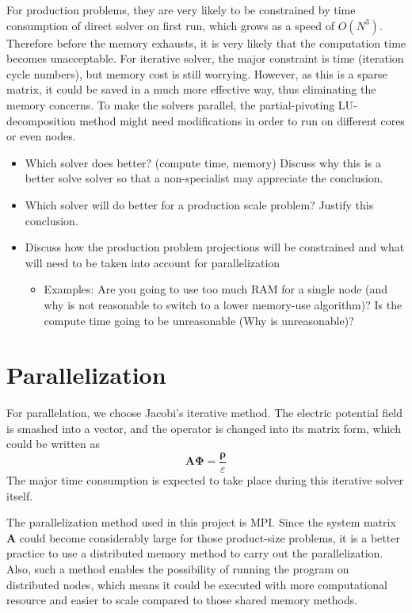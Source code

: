 \documentclass{article}
\begin{document}
\begin{spacing}{1.1}
For production problems, they are very likely to be constrained by time consumption of direct solver on first run, which grows as a speed of $O(N^3)$. Therefore before the memory exhausts, it is very likely that the computation time becomes unacceptable. For iterative solver, the major constraint is time (iteration cycle numbers), but memory cost is still worrying. However, as this is a sparse matrix, it could be saved in a much more effective way, thus eliminating the memory concerns. To make the solvers parallel, the partial-pivoting LU-decomposition method might need modifications in order to run on different cores or even nodes.

\begin{itemize}
    \item Which solver does better? (compute time, memory) Discuss why this is a better solve solver so that a non-specialist may appreciate the conclusion. 
    \item Which solver will do better for a production scale problem? Justify this conclusion.
    \item Discuss how the production problem projections will be constrained and what will need to be taken into account for parallelization
    \begin{itemize}
        \item Examples: Are you going to use too much RAM for a single node (and why is not reasonable to switch to a lower memory-use algorithm)? Is the compute time going to be unreasonable (Why is unreasonable)?
    \end{itemize}
\end{itemize}


\section{Parallelization}

For parallelation, we choose Jacobi's iterative method. The electric potential field is smashed into a vector, and the operator is changed into its matrix form, which could be written as
\[\mathbf{A\Phi}=\frac{\mathbf{\rho}}{\varepsilon}\]
The major time consumption is expected to take place during this iterative solver itself.

The parallelization method used in this project is MPI. Since the system matrix $\mathbf{A}$ could become considerably large for those product-size problems, it is a better practice to use a distributed memory method to carry out the parallelization. Also, such a method enables the possibility of running the program on distributed nodes, which means it could be executed with more computational resource and easier to scale compared to those shared memory methods.


\end{spacing}
\end{document}
